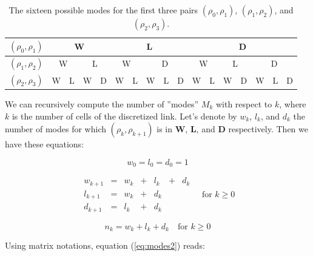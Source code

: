 \begin{table}[ht]
\centering %
\begin{tabular}{|c|c|c|c|c|c|c|c|c|c|c|c|c|c|c|c|c|}
  \hline
  $(\rho_{0},\rho_{1})$ & \multicolumn{4}{|c|}{W} & \multicolumn{5}{|c|}{L} & \multicolumn{7}{|c|}{D}\\
  \hline
  $(\rho_{1},\rho_{2})$ & \multicolumn{2}{|c|}{W} & \multicolumn{2}{|c|}{L} & \multicolumn{2}{|c|}{W} & \multicolumn{3}{|c|}{D} & \multicolumn{2}{|c|}{W} & \multicolumn{2}{|c|}{L} & \multicolumn{3}{|c|}{D}\\
  \hline
  $(\rho_{2},\rho_{3})$ & W & L & W & D & W & L & W & L & D & W & L & W & D & W & L & D\\
  \hline
\end{tabular}
\label{table:threeLevelModes} %
\caption{The sixteen possible modes for the first three pairs $(\rho_{0},\rho_{1})$, $(\rho_{1},\rho_{2})$, and $(\rho_{2},\rho_{3})$.}
\end{table}

We can recursively compute the number of ''modes'' $M_{k}$ with respect to $k$, where $k$ is the number of cells of the discretized link. Let's denote by $w_{k}$, $l_{k}$, and $d_{k}$ the number of modes for which $(\rho_{k},\rho_{k+1})$ is in \textbf{W}, \textbf{L}, and \textbf{D} respectively. Then we have these equations: 

\begin{equation}
w_{0} = l_{0} = d_{0} = 1
\label{eq:modes1}
\end{equation}

\begin{equation}
\begin{array}{lllllll}
w_{k+1} & = & w_{k} & + & l_{k} & + & d_{k}\\
l_{k+1} & = & w_{k} & + & d_{k} & & \\
d_{k+1} & = & l_{k} & + & d_{k} & &
\end{array} \quad \text{for }k \geq 0
\label{eq:modes2}
\end{equation}

\begin{equation}
n_{k} = w_{k} + l_{k} + d_{k} \quad \text{for }k \geq 0
\label{eq:modes3}
\end{equation}

Using matrix notations, equation (\ref{eq:modes2}) reads:

